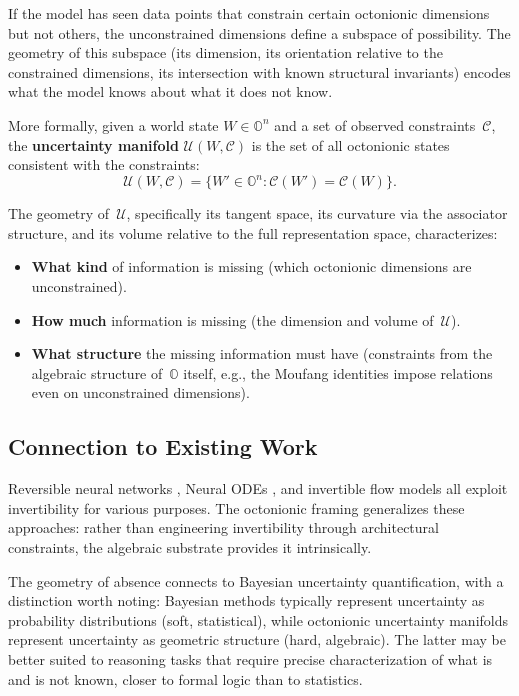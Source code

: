 \documentclass[11pt,a4paper]{article}
\newcommand{\Oct}{\mathbb{O}}
\begin{document}
If the model has seen data points that constrain certain octonionic dimensions but not others, the unconstrained dimensions define a subspace of possibility. The geometry of this subspace (its dimension, its orientation relative to the constrained dimensions, its intersection with known structural invariants) encodes what the model knows about what it does not know.

More formally, given a world state $W \in \Oct^n$ and a set of observed constraints~$\mathcal{C}$, the \textbf{uncertainty manifold} $\mathcal{U}(W, \mathcal{C})$ is the set of all octonionic states consistent with the constraints:
\begin{equation}
\mathcal{U}(W, \mathcal{C}) = \bigl\{ W' \in \Oct^n : \mathcal{C}(W') = \mathcal{C}(W) \bigr\}.
\end{equation}

The geometry of~$\mathcal{U}$, specifically its tangent space, its curvature via the associator structure, and its volume relative to the full representation space, characterizes:
\begin{itemize}[nosep]
  \item \textbf{What kind} of information is missing (which octonionic dimensions are unconstrained).
  \item \textbf{How much} information is missing (the dimension and volume of~$\mathcal{U}$).
  \item \textbf{What structure} the missing information must have (constraints from the algebraic structure of~$\Oct$ itself, e.g., the Moufang identities impose relations even on unconstrained dimensions).
\end{itemize}

\subsection{Connection to Existing Work}

Reversible neural networks \citep{Gomez2017}, Neural ODEs \citep{Chen2018}, and invertible flow models \citep{Dinh2016} all exploit invertibility for various purposes. The octonionic framing generalizes these approaches: rather than engineering invertibility through architectural constraints, the algebraic substrate provides it intrinsically.

The geometry of absence connects to Bayesian uncertainty quantification, with a distinction worth noting: Bayesian methods typically represent uncertainty as probability distributions (soft, statistical), while octonionic uncertainty manifolds represent uncertainty as geometric structure (hard, algebraic). The latter may be better suited to reasoning tasks that require precise characterization of what is and is not known, closer to formal logic than to statistics.
\end{document}
